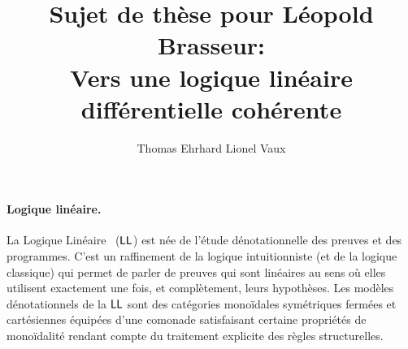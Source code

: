 \documentclass[a4]{article}
\title{Sujet de thèse pour Léopold Brasseur:\\
  Vers une logique linéaire différentielle cohérente}
\author{Thomas Ehrhard \hspace{5em} Lionel Vaux}
\begin{document}
\maketitle


\paragraph*{Logique linéaire.}
La Logique Linéaire~\cite{Girard87} ($\hbox{\textsf{LL}}$) est née de l'étude
dé\-no\-ta\-tion\-nelle des preuves et des programmes.
%
C'est un raffinement de la logique intuitionniste (et de la logique
classique) qui permet de parler de preuves qui sont linéaires au sens
où elles utilisent exactement une fois, et complètement, leurs
hypothèses.
%
%
Les modèles dénotationnels de la $\hbox{\textsf{LL}}$ sont des catégories monoïdales
sy\-mé\-tri\-ques fermées et cartésiennes équipées d'une comonade
satisfaisant certaine propriétés de monoïdalité rendant compte du
traitement explicite des règles structurelles.
\end{document}
